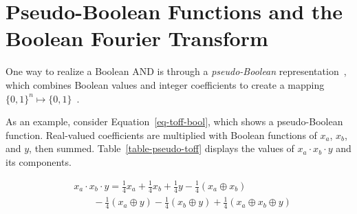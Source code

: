 \documentclass[a4paper]{article}
\begin{document}
\vspace{0.5cm}

\section{Pseudo-Boolean Functions and the Boolean Fourier Transform}

\vspace{0.3cm}

One way to realize a Boolean AND is through a {\it pseudo-Boolean} representation~\cite{bib-barenco-elementary,bib-amy-cnot}, which combines Boolean values and integer coefficients to create a mapping $\{0,1\}^n \mapsto \{0,1\}$~\cite{bib-amy-rm}.

\vspace{0.3cm}

As an example, consider Equation~\ref{eq-toff-bool}, which shows a pseudo-Boolean function. Real-valued coefficients are multiplied with Boolean functions of $x_a$, $x_b$, and $y$, then summed. Table~\ref{table-pseudo-toff} displays the values of $x_a \cdot x_b \cdot y$ and its components.

\vspace{0.2cm}

\begin{equation}
  \label{eq-toff-bool}
  \begin{aligned}
    &x_a \cdot x_b \cdot y = \frac{1}{4}x_a + \frac{1}{4}x_b + \frac{1}{4}y - \frac{1}{4}(x_a \oplus x_b) \\
    &\qquad -\frac{1}{4}(x_a \oplus y) - \frac{1}{4}(x_b \oplus y) + \frac{1}{4}(x_a \oplus x_b \oplus y)
  \end{aligned}
\end{equation}

\vspace{0.2cm}
\end{document}
